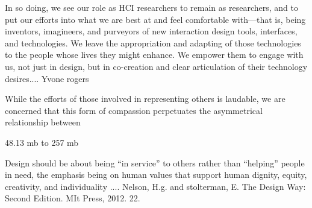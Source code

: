 In so doing, we see our role as HCI researchers to remain as researchers, and to put our efforts into what we are best at and feel comfortable with—that is, being inventors, imagineers, and purveyors of new interaction design tools, interfaces, and technologies. We leave the appropriation and adapting of those technologies to the people whose lives they might enhance.  We empower them to engage with us, not just in design, but in co-creation and clear articulation of their technology desires.... Yvone rogers

While the efforts of those involved in representing others is laudable, we are concerned that this form of compassion perpetuates the asymmetrical relationship between

48.13 mb to 257 mb

Design should be about being “in service” to others rather than “helping” people in need, the emphasis being on human values that support human dignity, equity, creativity, and individuality   .... Nelson, H.g. and stolterman, E. The Design Way: Second Edition. MIt Press, 2012. 22.